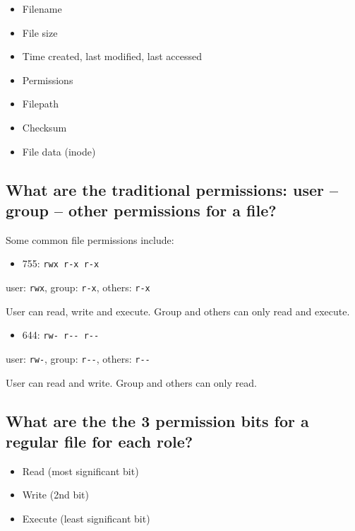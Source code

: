 \begin{itemize}
\itemsep1pt\parskip0pt
\item
  Filename
\item
  File size
\item
  Time created, last modified, last accessed
\item
  Permissions
\item
  Filepath
\item
  Checksum
\item
  File data (inode)
\end{itemize}

\subsection{What are the traditional permissions: user -- group -- other
permissions for a
file?}\label{what-are-the-traditional-permissions-user-group-other-permissions-for-a-file}

Some common file permissions include:

\begin{itemize}
\itemsep1pt\parskip0pt
\item
  755: \texttt{rwx\ r-x\ r-x}
\end{itemize}

user: \texttt{rwx}, group: \texttt{r-x}, others: \texttt{r-x}

User can read, write and execute. Group and others can only read and
execute.

\begin{itemize}
\itemsep1pt\parskip0pt
\item
  644: \texttt{rw-\ r-\/-\ r-\/-}
\end{itemize}

user: \texttt{rw-}, group: \texttt{r-\/-}, others: \texttt{r-\/-}

User can read and write. Group and others can only read.

\subsection{What are the the 3 permission bits for a regular file for
each
role?}\label{what-are-the-the-3-permission-bits-for-a-regular-file-for-each-role}

\begin{itemize}
\itemsep1pt\parskip0pt
\item
  Read (most significant bit)\\
\item
  Write (2nd bit)\\
\item
  Execute (least significant bit)
\end{itemize}

